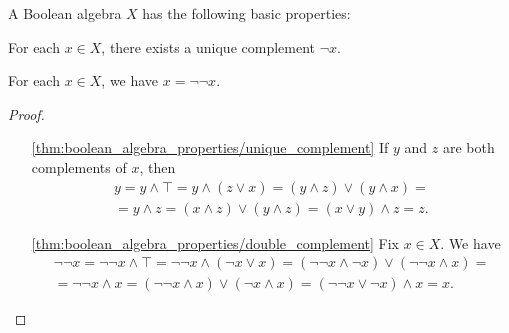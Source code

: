 \begin{proposition}\label{thm:boolean_algebra_properties}
  A Boolean algebra \( X \) has the following basic properties:
  \begin{defenum}
    \item\label{thm:boolean_algebra_properties/unique_complement} For each \( x \in X \), there exists a unique complement \( \neg x \).
    \item\label{thm:boolean_algebra_properties/double_complement} For each \( x \in X \), we have \( x = \neg \neg x \).
  \end{defenum}
\end{proposition}
\begin{proof}\mbox{}
  \begin{itemize}
    \item[\ref{thm:boolean_algebra_properties/unique_complement}] If \( y \) and \( z \) are both complements of \( x \), then
    \begin{align*}
      y
      =
      y \land \top
      =
      y \land (z \lor x)
      =
      (y \land z) \lor (y \land x)
      = \\ =
      y \land z
      =
      (x \land z) \lor (y \land z)
      =
      (x \lor y) \land z
      =
      z.
    \end{align*}

    \item[\ref{thm:boolean_algebra_properties/double_complement}] Fix \( x \in X \). We have
    \begin{align*}
      \neg \neg x
      =
      \neg \neg x \land \top
      =
      \neg \neg x \land (\neg x \lor x)
      =
      (\neg \neg x \land \neg x) \lor (\neg \neg x \land x)
      = \\ =
      \neg \neg x \land x
      =
      (\neg \neg x \land x) \lor (\neg x \land x)
      =
      (\neg \neg x \lor \neg x) \land x
      =
      x.
    \end{align*}
  \end{itemize}
\end{proof}
